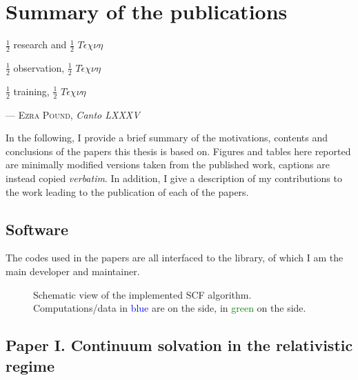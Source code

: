\chapter{Summary of the publications}\label{ch:publications-summary}

\epigraph{$\frac{1}{2}$ research and $\frac{1}{2}\,\,T\acute{\epsilon}\chi\nu\eta$

          $\frac{1}{2}$ observation, $\frac{1}{2}\,\,T\acute{\epsilon}\chi\nu\eta$

          $\frac{1}{2}$ training, $\frac{1}{2}\,\,T\acute{\epsilon}\chi\nu\eta$}{
  --- \textsc{Ezra Pound}, \textit{Canto LXXXV}}

In the following, I provide a brief summary of the motivations, contents and
conclusions of the papers this thesis is based on.
Figures and tables here reported are minimally modified versions taken from the published work,
captions are instead copied \emph{verbatim}.
In addition, I give a description of my contributions to the work leading to
the publication of each of the papers.

\pagebreak

\section*{Software}

The codes used in the papers are all interfaced to the \pcmsolver library,
of which I am the main developer and maintainer.

\begin{figure}[!htb]
\centering
\scalebox{0.8}{}
\caption[Modular approach to programming a \acs{PCM} functionality into an existing \acs{SCF} code.]{
  Schematic view of the implemented SCF algorithm. Computations/data in
  \textcolor{Blue}{blue} are on the \pcmsolver side, in
  \textcolor{Green}{green} on the \DIRAC side.
  }
\label{fig:algorithm}
\end{figure}

\section*{Paper I. Continuum solvation in the relativistic regime}

